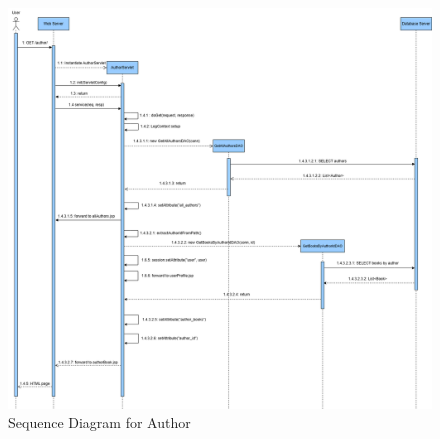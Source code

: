 \clearpage
\begin{figure}[h!]
    \centering
    \includegraphics[width=\textwidth]{photos/Sequence_Diagram_for_AuthorServlet.png}
    \caption{Sequence Diagram for Author}
    \label{fig:addtocartsequencediagram}
\end{figure}